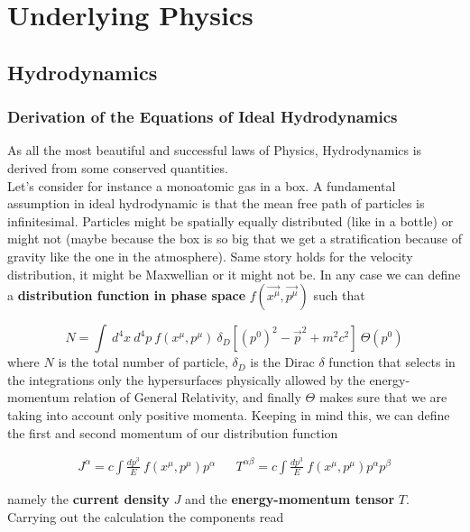 \documentclass[11pt]{article}
\numberwithin{equation}{section}
\begin{document}
\section{Underlying Physics}
\subsection{Hydrodynamics}
\subsubsection{Derivation of the Equations of Ideal Hydrodynamics}
As all the most beautiful and successful laws of Physics, Hydrodynamics is derived from some conserved quantities. \\
Let's consider for instance a monoatomic gas in a box. A fundamental assumption in ideal hydrodynamic is that the mean free path of particles is infinitesimal. Particles might be spatially equally distributed (like in a bottle) or might not (maybe because the box is so big that we get a stratification because of gravity like the one in the atmosphere). Same story holds for the velocity distribution, it might be Maxwellian or it might not be. 
In any case we can define a \textbf{distribution function in phase space} $f( \vec{x^{\mu}}, \vec{p^{\mu}})$ such that

$$N=\int \ d^4x \ d^4p \ f( x^{\mu}, p^{\mu}) \  \delta_D[(p^0)^2-\vec{p}^2+m^2c^2] \  \Theta(p^0)$$ 
 where $N$ is the total number of particle, $\delta_D$ is the Dirac $\delta$ function that selects in the integrations only the hypersurfaces physically allowed by the energy-momentum relation of General Relativity, and finally $\Theta$ makes sure that we are taking into account only positive momenta. 
Keeping in mind this, we can define the first and second momentum of our distribution function

\begin{align}
J^{\alpha}= c \int \frac{dp^3}{E} \ f( x^{\mu}, p^{\mu}) p^{\alpha}  &&   T^{\alpha \beta}= c \int \frac{dp^3}{E} \ f( x^{\mu}, p^{\mu}) p^{\alpha}p^{\beta}  
\end{align}
 
namely the \textbf{current density} $J$ and the \textbf{energy-momentum tensor} $T$. Carrying out the calculation the components read 
\end{document}
